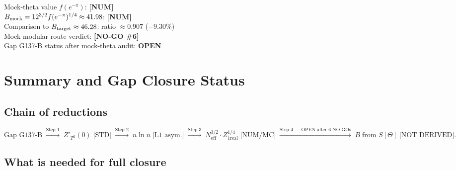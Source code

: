 \documentclass[12pt,a4paper]{article}
\begin{document}
\begin{statusbox}
Mock-theta value $f(e^{-\pi})$: \textbf{[NUM]}\\
$B_{\rm mock}=12^{3/2}f(e^{-\pi})^{1/4}\approx 41.98$: \textbf{[NUM]}\\
Comparison to $B_{\rm target}\approx46.28$: ratio $\approx 0.907$ (\(-9.30\%\))\\
Mock modular route verdict: \textbf{[NO-GO \#6]}\\
Gap G137-B status after mock-theta audit: \textbf{OPEN}
\end{statusbox}

\section{Summary and Gap Closure Status}
\label{sec:summary}

\subsection*{Chain of reductions}

\[
\text{Gap G137-B}
\;\xrightarrow{\text{Step 1}}\;
Z'_{T^2}(0) \;\text{[STD]}
\;\xrightarrow{\text{Step 2}}\;
n\ln n \;\text{[L1 asym.]}
\;\xrightarrow{\text{Step 3}}\;
N_{\mathrm{eff}}^{3/2}\cdot Z_{1\mathrm{real}}^{1/4} \;\text{[NUM/MC]}
\;\xrightarrow{\text{Step 4 --- OPEN after 6 NO-GOs}}\;
B \;\text{from } S[\Theta] \;\text{[NOT DERIVED]}.
\]

\subsection*{What is needed for full closure}
\end{document}
